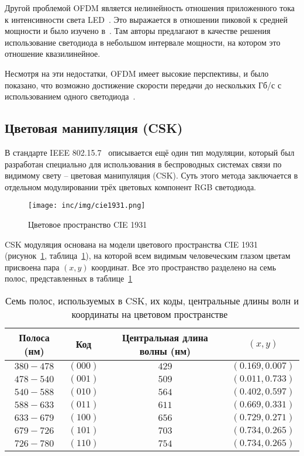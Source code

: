 Другой проблемой OFDM является нелинейность отношения приложенного тока к интенсивности света LED~\cite{Burchardt2014}. Это выражается в отношении пиковой к средней мощности и было изучено в~\cite{Elgala2009,Elgala2009}. Там авторы предлагают в качестве решения использование светодиода в небольшом интервале мощности, на котором это отношение квазилинейное. 

Несмотря на эти недостатки, OFDM  имеет высокие перспективы, и было показано, что возможно достижение скорости передачи до нескольких Гб/с с использованием одного светодиода~\cite{Khalid2012,Tsonev2014}.

\subsection{Цветовая манипуляция (CSK)}
\label{CSK}

В стандарте IEEE 802.15.7~\cite{IEEE2018} описывается ещё один тип модуляции, который был разработан специально для использования в беспроводных системах связи по видимому свету \--- цветовая манипуляция (CSK). Суть этого метода заключается в отдельном модулировании трёх цветовых компонент RGB светодиода. 

\begin{figure}[!ht]
    \centering
    \texttt{[image: inc/img/cie1931.png]}
    \caption{Цветовое пространство CIE 1931~\cite{IEEE2018}}
    \label{fig:cie1931}
\end{figure}

CSK модуляция основана на модели цветового пространства CIE 1931~\cite{CIE1931} (рисунок~\ref{fig:cie1931}, таблица~\ref{table:cie1931}), на которой всем видимым человеческим глазом цветам присвоена пара $(x,y)$ координат. Все это пространство разделено на семь полос, представленных в таблице~\ref{table:cie1931}

\begin{table}[!h]
    \centering
    \begin{tabular}{|c| c| c| c|} 
     \hline
     Полоса (нм) & Код & Центральная длина волны (нм) & $(x,y)$ \\ \hline
     $380-478$ & $(000)$ & $429$ & $(0.169, 0.007)$ \\ \hline
     $478-540$ & $(001)$ & $509$ & $(0.011, 0.733)$ \\ \hline
     $540-588$ & $(010)$ & $564$ & $(0.402, 0.597)$ \\ \hline
     $588-633$ & $(011)$ & $611$ & $(0.669, 0.331)$ \\ \hline
     $633-679$ & $(100)$ & $656$ & $(0.729, 0.271)$ \\ \hline
     $679-726$ & $(101)$ & $703$ & $(0.734, 0.265)$ \\ \hline
     $726-780$ & $(110)$ & $754$ & $(0.734, 0.265)$ \\ \hline
    \end{tabular}
    \caption{Семь полос, используемых в CSK, их коды, центральные длины волн и координаты на цветовом пространстве~\cite{IEEE2018}}
    \label{table:cie1931}
\end{table}

